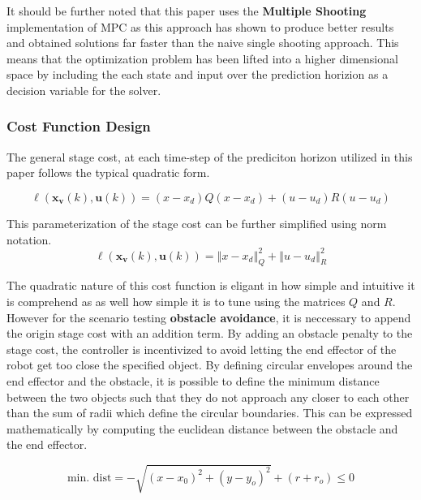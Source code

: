 \documentclass[journal]{IEEEtran}
\begin{document}
It should be further noted that this paper uses the \textbf{Multiple Shooting} implementation of MPC as this approach has shown to produce better results and obtained solutions far faster than the naive single shooting approach. This means that the optimization problem has been lifted into a higher dimensional space by including the each state and input over the prediction horizion as a decision variable for the solver. \\

\subsubsection{Cost Function Design}

The general stage cost, at each time-step of the prediciton horizon utilized in this paper follows the typical quadratic form.

\begin{equation}
  \ell\left(\mathbf{x}_{\mathbf{v}}(k), \mathbf{u}(k)\right) = (x-x_d)Q(x-x_d) + (u-u_d)R(u-u_d)
\end{equation}

This parameterization of the stage cost can be further simplified using norm notation.
\begin{equation}\label{eq:norm_cost}
  \ell\left(\mathbf{x}_{\mathbf{v}}(k), \mathbf{u}(k)\right) = \left\Vert x - x_d \right\Vert^{2}_{Q} + \left\Vert u -u_d \right\Vert^{2}_{R}
\end{equation}

The quadratic nature of this cost function is eligant in how simple and intuitive it is comprehend as as well how simple it is to tune using the matrices $Q$ and $R$. \\

However for the scenario testing \textbf{obstacle avoidance}, it is neccessary to append the origin stage cost with an addition term. By adding an obstacle penalty to the stage cost, the controller is incentivized to avoid letting the end effector of the robot get too close the specified object. By defining circular envelopes around the end effector and the obstacle, it is possible to define the minimum distance between the two objects such that they do not approach any closer to each other than the sum of radii which define the circular boundaries. This can be expressed mathematically by computing the euclidean distance between the obstacle and the end effector.

\begin{equation}\label{eq:obs_avoid_constraint}
\text{min. dist} = -\sqrt{\left(x-x_{0}\right)^{2}+\left(y-y_{o}\right)^{2}}+\left(r+r_{o}\right) \leq 0
\end{equation}
\end{document}
